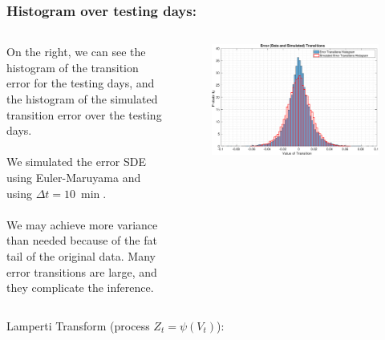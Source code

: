 \documentclass[aspectratio=169]{beamer}\usepackage[utf8]{inputenc}
\begin{document}

\begin{frame}\frametitle{Histogram over testing days:}

\begin{columns}

On the right, we can see the histogram of the transition error for the testing days, and the histogram of the simulated transition error over the testing days.\\
\quad\\
We simulated the error SDE using Euler-Maruyama and using $\Delta t=\SI{10}{\min}$.\\
\quad\\
We may achieve more variance than needed because of the fat tail of the original data. Many error transitions are large, and they complicate the inference.

\begin{figure}[ht!]
\centering
\includegraphics[width=1\textwidth]{../../MATLAB_Files/Results/histograms/classic/Optimal.eps}
\end{figure}

\end{columns}

\end{frame}


\begin{frame}

{\Huge Lamperti Transform (process $Z_t=\psi(V_t)$):}

\end{frame}
\end{document}

